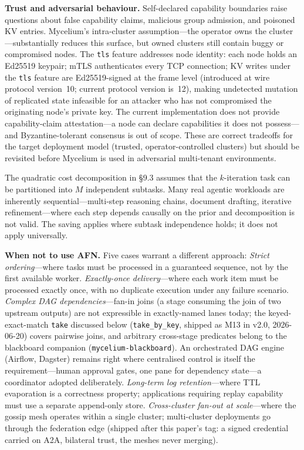 \documentclass[11pt]{article}
\begin{document}
\textbf{Trust and adversarial behaviour.} Self-declared capability boundaries
raise questions about false capability claims, malicious group admission, and
poisoned KV entries. Mycelium's intra-cluster assumption---the operator owns the
cluster---substantially reduces this surface, but owned clusters still contain
buggy or compromised nodes. The \texttt{tls} feature addresses node identity:
each node holds an Ed25519 keypair; mTLS authenticates every TCP connection;
KV writes under the \texttt{tls} feature are Ed25519-signed at the frame level
(introduced at wire protocol version~10; current protocol version is~12),
making undetected mutation of replicated state infeasible for
an attacker who has not compromised the originating node's private key. The
current implementation does not provide capability-claim attestation---a node
can declare capabilities it does not possess---and Byzantine-tolerant consensus
is out of scope. These are correct tradeoffs for the target deployment model
(trusted, operator-controlled clusters) but should be revisited before Mycelium
is used in adversarial multi-tenant environments.

The quadratic cost decomposition in \S9.3 assumes that the $k$-iteration task
can be partitioned into $M$ independent subtasks. Many real agentic workloads
are inherently sequential---multi-step reasoning chains, document drafting,
iterative refinement---where each step depends causally on the prior and
decomposition is not valid. The saving applies where subtask independence holds;
it does not apply universally.

\textbf{When not to use AFN.} Five cases warrant a different approach:
\emph{Strict ordering}---where tasks must be processed in a guaranteed sequence,
not by the first available worker.
\emph{Exactly-once delivery}---where each work item must be processed exactly
once, with no duplicate execution under any failure scenario.
\emph{Complex DAG dependencies}---fan-in joins (a stage consuming the join of
two upstream outputs) are not expressible in exactly-named lanes today; the
keyed-exact-match \texttt{take} discussed below (\texttt{take\_by\_key}, shipped as
M13 in v2.0, 2026-06-20) covers pairwise joins, and arbitrary cross-stage predicates belong to the blackboard
companion (\texttt{mycelium-blackboard}). An orchestrated DAG engine (Airflow, Dagster) remains
right where centralised control is itself the requirement---human approval
gates, one pane for dependency state---a coordinator adopted deliberately.
\emph{Long-term log retention}---where TTL evaporation is a correctness property;
applications requiring replay capability must use a separate append-only store.
\emph{Cross-cluster fan-out at scale}---where the gossip mesh operates within a
single cluster; multi-cluster deployments go through the federation edge (shipped
after this paper's tag: a signed credential carried on A2A, bilateral trust, the
meshes never merging).
\end{document}
